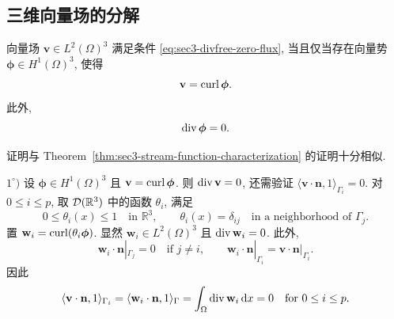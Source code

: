 \subsection{三维向量场的分解}\label{subsec:three-dimensional-decomposition}

\setcounter{statement}{3}
\begin{Theorem}\label{thm:sec3-three-dimensional-vector-potential}
向量场 $\mathbf v\in L^2(\Omega)^3$ 满足条件
\eqref{eq:sec3-divfree-zero-flux}, 当且仅当存在向量势
$\boldsymbol\phi\in H^1(\Omega)^3$, 使得
\[
\mathbf v=\operatorname{curl}\boldsymbol\phi.
\]
此外,
\[
\operatorname{div}\boldsymbol\phi=0.
\]
\end{Theorem}
\begin{Proof}
证明与 Theorem~\ref{thm:sec3-stream-function-characterization} 的证明十分相似.

$1^\circ)$ 设 $\boldsymbol\phi\in H^1(\Omega)^3$ 且
$\mathbf v=\operatorname{curl}\boldsymbol\phi$. 则 $\operatorname{div}\mathbf v=0$, 还需验证
$\langle\mathbf v\cdot\mathbf n,1\rangle_{\Gamma_i}=0$.
对 $0\le i\le p$, 取 $\mathcal{D}(\mathbb R^3)$ 中的函数 $\theta_i$, 满足
\[
0\le\theta_i(x)\le1\quad\text{in }\mathbb R^3,
\qquad
\theta_i(x)=\delta_{ij}\quad\text{in a neighborhood of }\Gamma_j.
\]
置 $\mathbf w_i=\operatorname{curl}(\theta_i\boldsymbol\phi)$. 显然
$\mathbf w_i\in L^2(\Omega)^3$ 且 $\operatorname{div}\mathbf w_i=0$. 此外,
\[
\mathbf w_i\cdot\mathbf n|_{\Gamma_j}=0\quad\text{if }j\ne i,
\qquad
\mathbf w_i\cdot\mathbf n|_{\Gamma_i}
=\mathbf v\cdot\mathbf n|_{\Gamma_i}.
\]
因此
\[
\langle\mathbf v\cdot\mathbf n,1\rangle_{\Gamma_i}
=\langle\mathbf w_i\cdot\mathbf n,1\rangle_\Gamma
=\int_\Omega\operatorname{div}\mathbf w_i\,\mathrm{d} x=0
\quad\text{for }0\le i\le p.
\]


\end{Proof}

